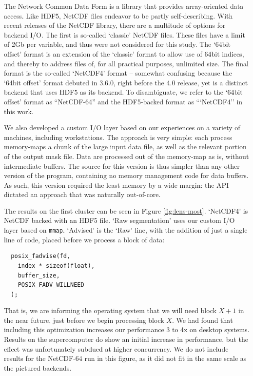 The Network Common Data Form is a library that provides array-oriented
data access.  Like HDF5, NetCDF files endeavor to be partly
self-describing.  With recent releases of the NetCDF library, there
are a multitude of options for backend I/O.  The first is so-called
`classic' NetCDF files.  These files have a limit of 2Gb per variable,
and thus were not considered for this study.  The `64bit offset' format
is an extension of the `classic' format to allow use of 64bit indices,
and thereby to address files of, for all practical purposes, unlimited
size.  The final format is the so-called `NetCDF4' format -- somewhat
confusing because the `64bit offset' format debuted in 3.6.0, right
before the 4.0 release, yet is a distinct backend that uses HDF5 as
its backend.  To disambiguate, we refer to the `64bit offset' format as
``NetCDF-64'' and the HDF5-backed format as ```NetCDF4'' in this work.

We also developed a custom I/O layer based on our experiences on a
variety of machines, including workstations.  The approach is very
simple: each process memory-maps a chunk of the large input data file,
as well as the relevant portion of the output mask file.  Data are
processed out of the memory-map as is, without intermediate buffers.
The source for this version is thus simpler than any other version of
the program, containing no memory management code for data buffers.  As
such, this version required the least memory by a wide margin: the API
dictated an approach that was naturally out-of-core.

The results on the first cluster can be seen in Figure
\ref{fig:lens-most}.  `NetCDF4' is NetCDF backed with an HDF5 file.
`Raw segmentation' uses our custom I/O layer based on \texttt{mmap}.
`Advised' is the `Raw' line, with the addition of just a single line of
code, placed before we process a block of data:
\begin{verbatim}
  posix_fadvise(fd,
    index * sizeof(float),
    buffer_size,
    POSIX_FADV_WILLNEED
  );
\end{verbatim} That is, we are informing the operating system that
we will need block $X+1$ in the near future, just before we begin
processing block $X$.  We had found that including this optimization
increases our performance 3 to 4x on desktop systems.  Results on the
supercomputer do show an initial increase in performance, but the
effect was unfortunately subdued at higher concurrency.  We do not
include results for the NetCDF-64 run in this figure, as it did not fit
in the same scale as the pictured backends.


